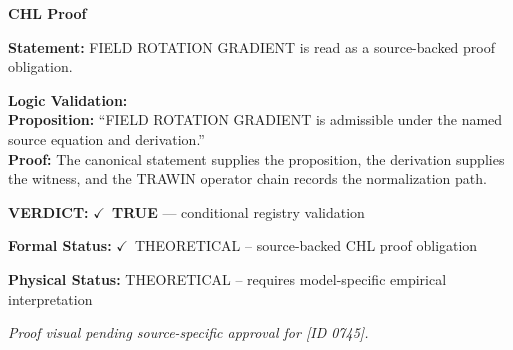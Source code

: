 \vspace{0.45em}
\noindent\textbf{CHL Proof}\par
\textbf{Statement:} FIELD ROTATION GRADIENT is read as a source-backed proof obligation.

\textbf{Logic Validation:}\\
\textbf{Proposition:} ``FIELD ROTATION GRADIENT is admissible under the named source equation and derivation.''\\
\textbf{Proof:} The canonical statement supplies the proposition, the derivation supplies the witness, and the TRAWIN operator chain records the normalization path.

\textbf{VERDICT:} \ensuremath{\checkmark}\ \textbf{TRUE} --- conditional registry validation

\textbf{Formal Status:} \ensuremath{\checkmark}\ THEORETICAL -- source-backed CHL proof obligation

\textbf{Physical Status:} THEORETICAL -- requires model-specific empirical interpretation
\par\vspace{0.45em}
\par
\vfill
\begingroup\footnotesize\itshape
Proof visual pending source-specific approval for [ID 0745].
\par\endgroup
\vfill
\endgroup
\endgroup
